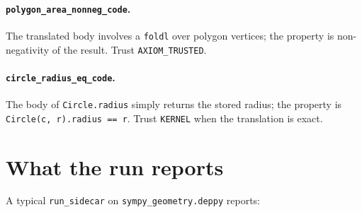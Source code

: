 \paragraph{\texttt{polygon\_area\_nonneg\_code}.}  The translated
body involves a \texttt{foldl} over polygon vertices; the
property is non-negativity of the result.  Trust
\texttt{AXIOM\_TRUSTED}.

\paragraph{\texttt{circle\_radius\_eq\_code}.}  The body of
\texttt{Circle.radius} simply returns the stored radius; the
property is \texttt{Circle(c, r).radius == r}.  Trust
\texttt{KERNEL} when the translation is exact.

\section{What the run reports}

A typical \texttt{run\_sidecar} on
\texttt{sympy\_geometry.deppy} reports:

